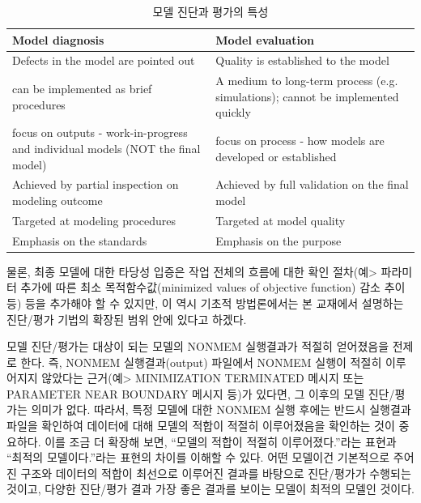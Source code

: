 \documentclass[
  10pt,
  krantz2,
  a4paper]{krantz}
\theoremstyle{definition}
\theoremstyle{definition}
\theoremstyle{definition}
\theoremstyle{remark}
\begin{document}
\begin{table}

\caption{\label{tab:diag-eval-property}모델 진단과 평가의 특성}
\centering
\begin{tabular}[t]{>{\raggedright\arraybackslash}p{7cm}>{\raggedright\arraybackslash}p{7cm}}
\toprule
Model diagnosis & Model evaluation\\
\midrule
Defects in the model are pointed out & Quality is established to the model\\
can be implemented as brief procedures & A medium to long-term process (e.g. simulations); cannot be implemented quickly\\
focus on outputs - work-in-progress and individual models (NOT the final model) & focus on process - how models are developed or established\\
Achieved by partial inspection on modeling outcome & Achieved by full validation on the final model\\
Targeted at modeling procedures & Targeted at model quality\\
\addlinespace
Emphasis on the standards & Emphasis on the purpose\\
\bottomrule
\end{tabular}
\end{table}



물론, 최종 모델에 대한 타당성 입증은 작업 전체의 흐름에 대한 확인 절차(예\textgreater{} 파라미터 추가에 따른 최소 목적함수값(minimized values of objective function) 감소 추이 등) 등을 추가해야 할 수 있지만, 이 역시 기초적 방법론에서는 본 교재에서 설명하는 진단/평가 기법의 확장된 범위 안에 있다고 하겠다.

모델 진단/평가는 대상이 되는 모델의 NONMEM 실행결과가 적절히 얻어졌음을 전제로 한다. 즉, NONMEM 실행결과(output) 파일에서 NONMEM 실행이 적절히 이루어지지 않았다는 근거(예\textgreater{} MINIMIZATION TERMINATED 메시지 또는 PARAMETER NEAR BOUNDARY 메시지 등)가 있다면, 그 이후의 모델 진단/평가는 의미가 없다. 따라서, 특정 모델에 대한 NONMEM 실행 후에는 반드시 실행결과 파일을 확인하여 데이터에 대해 모델의 적합이 적절히 이루어졌음을 확인하는 것이 중요하다. 이를 조금 더 확장해 보면, ``모델의 적합이 적절히 이루어졌다.''라는 표현과 ``최적의 모델이다.''라는 표현의 차이를 이해할 수 있다. 어떤 모델이건 기본적으로 주어진 구조와 데이터의 적합이 최선으로 이루어진 결과를 바탕으로 진단/평가가 수행되는 것이고, 다양한 진단/평가 결과 가장 좋은 결과를 보이는 모델이 최적의 모델인 것이다.
\end{document}
